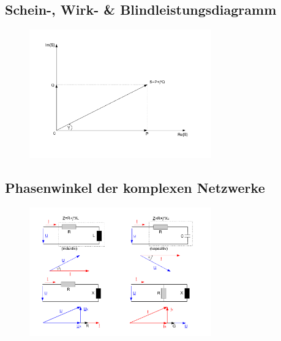 \documentclass[11pt]{article}
\begin{document}
\begin{spacing}{0.1}
\subsection*{Schein-, Wirk- \& Blindleistungsdiagramm}
\begin{figure}[H]
	\centering
	\includegraphics[width=0.7\textwidth]{img/drehstrom_komplexe_leistung.pdf}
\end{figure}
\subsection*{Phasenwinkel der komplexen Netzwerke}
\begin{figure}[H]
	\centering
	\includegraphics[width=0.7\textwidth]{img/drehstrom_Phasenwinkel.pdf}
\end{figure}
\end{spacing}
\end{document}
